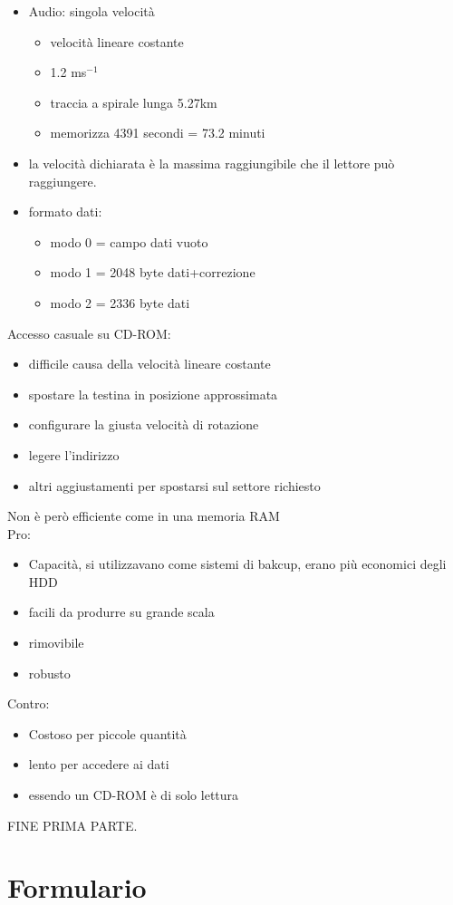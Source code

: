 \documentclass[12pt, a4paper]{article}
\begin{document}
\begin{itemize}
	\item Audio: singola velocità
	\begin{itemize}
		\item velocità lineare costante
		\item 1.2 ms$^{-1}$
		\item traccia a spirale lunga 5.27km
		\item memorizza 4391 secondi = 73.2 minuti
	\end{itemize}
	\item la velocità dichiarata è la massima raggiungibile che il lettore può
		raggiungere.
	\item formato dati:
		\begin{itemize}
			\item modo 0 = campo dati vuoto
			\item modo 1 = 2048 byte dati+correzione
			\item modo 2 = 2336 byte dati
		\end{itemize}
\end{itemize}
Accesso casuale su CD-ROM:

\begin{itemize}
	\item difficile causa della velocità lineare costante
	\item spostare la testina in posizione approssimata
	\item configurare la giusta velocità di rotazione 
	\item legere l'indirizzo
	\item altri aggiustamenti per spostarsi sul settore richiesto
\end{itemize}
Non è però efficiente come in una memoria RAM\\
Pro:

\begin{itemize}
	\item Capacità, si utilizzavano come sistemi di bakcup,
		erano più economici degli HDD
	\item facili da produrre su grande scala
	\item rimovibile
	\item robusto
\end{itemize}

Contro:		
\begin{itemize}
	\item Costoso per piccole quantità
	\item lento per accedere ai dati
	\item essendo un CD-ROM è di solo lettura
\end{itemize}

\Huge FINE PRIMA PARTE.
\section{Formulario}
\end{document}
